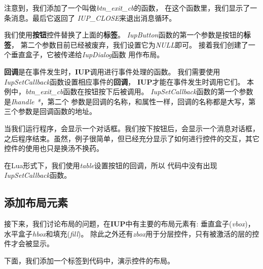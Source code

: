 \documentclass{ctexart}
\begin{document}
注意到，我们添加了一个叫做\emph{btn\_exit\_cb}的函数，
在这个函数里，我们显示了一条消息。最后它返回了
\emph{IUP\_CLOSE}来退出消息循环。

我们使用\textbf{按钮}控件替换了上面的\textbf{标签}。
\emph{IupButton}函数的第一个参数是按钮的\textbf{标签}，
第二个参数目前已经被废弃，我们设置它为\emph{NULL}即可。
接着我们创建了一个垂直盒子，它被传递给\emph{IupDialog}函数
用作布局。

\textbf{回调}是在事件发生时，\textbf{IUP}调用进行事件处理的函数。
我们需要使用\emph{IupSetCallback}函数设置相应事件的\textbf{回调}，
\textbf{IUP}才能在事件发生时调用它们。
本例中，\emph{btn\_exit\_cb}函数在按钮按下后被调用。
\emph{IupSetCallback}函数的第一个参数是\emph{Ihandle *}，第二个
参数是回调的名称，和属性一样，回调的名称都是大写，第三个参数是回调函数的地址。

当我们运行程序，会显示一个对话框。我们按下按钮后，会显示一个消息对话框，
之后程序结束。虽然，例子很简单，但已经充分显示了如何进行控件的交互，其它
控件的使用也只是换汤不换药。

在Lua形式下，我们使用\emph{table}设置按钮的回调，所以
代码中没有出现\emph{IupSetCallback}函数。

\subsection{添加布局元素}

接下来，我们讨论布局的问题，在\textbf{IUP}中有主要的布局元素有:
垂直盒子(\emph{vbox})，水平盒子\emph{hbox}和填充(\emph{fill})。
除此之外还有\emph{zbox}用于分层控件，只有被激活的层的控件才会被显示。

下面，我们添加一个标签到代码中，演示控件的布局。
\end{document}
